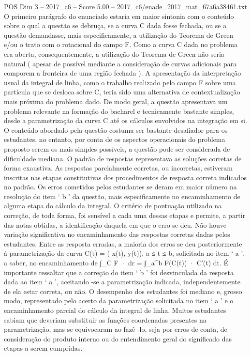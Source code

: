 \begin{textsample}{POS Dim 3 – 2017\_c6 – Score 5.00 – 2017\_c6/enade\_2017\_mat\_67a6a38461.txt}
O primeiro parágrafo do enunciado estaria em maior sintonia com o conteúdo sobre o qual a questão se debruça, se a curva C dada fosse fechada, ou se a questão demandasse, mais especificamente, a utilização do Teorema de Green e/ou o trato com o rotacional do campo F.
Como a curva C dada no problema era aberta, consequentemente, a utilização do Teorema de Green não seria natural ( apesar de possível mediante a consideração de curvas adicionais para comporem a fronteira de uma região fechada ).
A apresentação da interpretação usual da integral de linha, como o trabalho realizado pelo campo F sobre uma partícula que se desloca sobre C, teria sido uma alternativa de contextualização mais próxima do problema dado.
De modo geral, a questão apresentava um problema relevante na formação do bacharel e tecnicamente bastante simples, desde a parametrização da curva C até os cálculos envolvidos na integração em si.
O conteúdo abordado pela questão costuma ser bastante desafiador para os estudantes, no entanto, por conta de os aspectos operacionais do problema proposto serem os mais simples possíveis, a questão pode ser considerada de dificuldade mediana.
O padrão de respostas representava as soluções corretas de forma exaustiva.
As respostas parcialmente corretas, ou incorretas, estiveram inscritas nas etapas constitutivas dos procedimentos de resposta correta indicados no padrão.
Os erros cometidos pelos estudantes se deram em maior número na resolução do item ‘ b ’ da questão, mais especificamente no encaminhamento de alguma etapa do cálculo da integral.
O critério de pontuação utilizado na correção, de toda forma, foi sensível a cada uma dessas etapas e permite, a partir das notas obtidas, a identificação daquela em que o erro se deu.
Não houve variação significativa no encaminhamento das respostas corretas dadas pelos estudantes.
Entre as resposta erradas, a maioria dos erros se deu posteriormente à parametrização da curva C(t) = ( x(t), y(t)), a ≤ t ≤ b, solicitada no item ‘ a ’, a saber, no encaminhamento de ∫\_C F · dr = ∫\_a\textasciicircum{}b F(C(t)) · C′(t) dt.
É importante ressaltar que a correção do item ‘ b ’ foi desvinculada da resposta dada ao item ‘ a ’, aceitando -se a parametrização indicada, independentemente de ela estar correta, ou não.
O desempenho dos estudantes foi mediano e, grosso modo, representado pelo acerto da parametrização solicitada no item ‘ a ’ e o encaminhamento parcial do cálculo da integral de linha.
Muitos estudantes sabiam que deveriam substituir as funções coordenadas presentes na parametrização, mas se equivocaram ao fazê -lo, seja por erros de conta, de consideração do produto interno ou do entendimento geral do significado das etapas a serem cumpridas.

\end{textsample}
